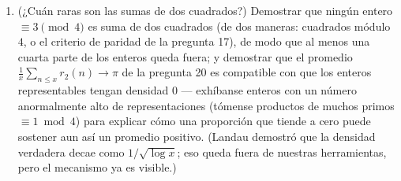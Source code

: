\begin{problem}
\begin{enumerate}[resume]
  19--20:
        \[
        \sum_{d \leq x}\chi(d)\Bigl\lfloor\frac
        xd\Bigr\rfloor = \frac{\pi x}4 + O(\sqrt x),
        \]
        y dedúzcase --- eliminando con cuidado las partes enteras --- la
        serie de Leibniz
        \[
        1 - \frac13 + \frac15 - \frac17 + \dots = \frac\pi4 .
        \]
        La serie alternada de los inversos de los impares \emph{es} el
        exceso medio de divisores $\equiv 1$ sobre divisores $\equiv 3$:
        el análisis calculado por la aritmética. \item (¿Cuán raras son
        las sumas de dos cuadrados?) Demostrar que ningún entero
        $\equiv 3 \pmod 4$ es suma de dos cuadrados (de dos maneras:
        cuadrados módulo $4$, o el criterio de paridad de la pregunta
        17), de modo que al menos una cuarta parte de los enteros queda
        fuera; y demostrar que el promedio $\frac1x\sum_{n\leq
        x}r_2(n) \to \pi$ de la pregunta 20 es compatible con que los
        enteros representables tengan densidad $0$ --- exhíbanse enteros
        con un número anormalmente alto de representaciones (tómense
        productos de muchos primos $\equiv 1 \bmod 4$) para explicar
        cómo una proporción que tiende a cero puede sostener aun así un
        promedio positivo. (Landau demostró que la densidad verdadera
        decae como $1/\sqrt{\log x}$; eso queda fuera de nuestras
        herramientas, pero el mecanismo ya es visible.)
\end{enumerate}


\end{problem}
